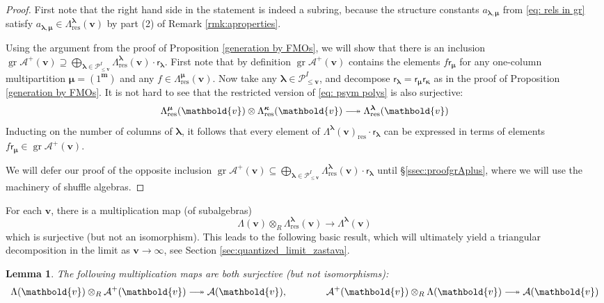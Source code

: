 \documentclass[11pt,reqno]{amsart}
\renewcommand{\mathbf}{\mathbold}
\numberwithin{equation}{section}
\newtheorem{Lemma}[equation]{Lemma}
\theoremstyle{definition}
\newcommand{\cA}{\mathcal{A}}
\newcommand{\cP}{\mathcal{P}}
\newcommand{\bm}{\mathbf{m}}
\newcommand{\bv}{\mathbf{v}}
\newcommand{\twoheadlongrightarrow}{\relbar\joinrel\twoheadrightarrow}
\DeclareMathOperator{\gr}{gr}
\renewcommand{\bv}{\mathbf{v}} %
\newcommand{\sfr}{{\mathsf{r}}}
\newcommand{\vertexset}{I}
\newcommand{\GT}{\Lambda}
\newcommand{\base}{R}
\newcommand{\Partitions}{\cP}
\newcommand{\bla}{{\boldsymbol{\lambda}}}
\newcommand{\bmu}{{\boldsymbol{\mu}}}
\newcommand{\qzast}{\cA}
\newcommand{\qzastplus}{\cA^{+}}
\newcommand{\res}{\mathrm{res}}
\begin{document}
\begin{proof}
    First note that the right hand side in the statement is indeed a subring, because the structure constants $a_{\bla,\bmu}$ from \eqref{eq: rels in gr} satisfy $a_{\bla,\bmu} \in \GT_{\res}^\bla(\bv)$  by part (2) of Remark \ref{rmk:aproperties}.
    
    Using the  argument from the proof of Proposition \ref{generation by FMOs}, we will show that there is an inclusion $\gr \qzastplus(\bv) \supseteq \bigoplus_{\bla \in \Partitions_{\leq \bv}^\vertexset} \GT_{\res}^\bla(\bv) \cdot \sfr_\bla$.  First note that by definition $\gr \qzastplus(\bv)$ contains the elements $f \sfr_\bmu$ for any one-column multipartition $\bmu = (1^\bm)$ and any $f \in \GT_{\res}^\bmu(\bv)$.  Now take  any $\bla \in \Partitions_{\leq \bv}^\vertexset$, and decompose $\sfr_\bla = \sfr_\bmu \sfr_{\boldsymbol{\kappa}}$ as in the proof of Proposition \ref{generation by FMOs}.  It is not hard to see that the restricted version of \eqref{eq: psym polys} is also surjective:
    $$
    \GT_{\res}^\bmu(\bv) \otimes \GT^{\boldsymbol{\kappa}}_{\res}(\bv) \twoheadlongrightarrow \GT_{\res}^\bla(\bv)
    $$
    Inducting on the number of columns of $\bla$, it follows that every element of $\GT^\bla(\bv)_\res \cdot \sfr_\bla$ can be expressed in terms of elements $ f \sfr_\bmu \in \gr \qzastplus(\bv)$.

    We will defer our proof of the opposite inclusion $\gr \qzastplus(\bv) \subseteq \bigoplus_{\bla \in \Partitions_{\leq \bv}^\vertexset} \GT_{\res}^\bla(\bv) \cdot \sfr_\bla$ until \S \ref{ssec:proofgrAplus}, where we will use the machinery of shuffle algebras.
\end{proof}



For each $\bv$, there is a multiplication map  (of subalgebras)
\begin{equation}
    \GT(\bv) \otimes_\base \GT_\res^\bla(\bv) \longrightarrow \GT^\bla(\bv)
\end{equation}
which is surjective (but not an isomorphism). This leads to the following basic result, which will ultimately yield a triangular decomposition in the limit as $\bv \rightarrow \infty$, see Section \ref{sec:quantized_limit_zastava}.

\begin{Lemma}
    \label{lem: truncated triangular decomp}
    The following multiplication maps are both surjective (but \emph{not} isomorphisms): 
    $$
    \GT(\bv) \otimes_\base \qzastplus(\bv) \twoheadlongrightarrow \qzast(\bv), \qquad \qquad \qzastplus(\bv)\otimes_\base \GT(\bv) \twoheadlongrightarrow \qzast(\bv)
    $$
\end{Lemma}
\end{document}
